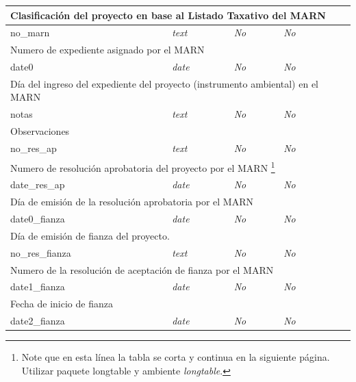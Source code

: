 \begin{longtable}{|l|l|l|l|l|}
	\multicolumn{ 5}{|l|}{Clasificación del proyecto en base al Listado Taxativo del MARN} \\ \hline
		no\_marn & \textit{text} & \textit{No} & \textit{No} & \textit{} \\ \hline

	\multicolumn{ 5}{|l|}{Numero de expediente asignado por el MARN} \\ \hline
		date0 & \textit{date} & \textit{No} & \textit{No} & \textit{} \\ \hline

	\multicolumn{ 5}{|l|}{Día del ingreso del expediente del proyecto (instrumento ambiental) en el MARN} \\ \hline
		notas & \textit{text} & \textit{No} & \textit{No} & \textit{} \\ \hline

	\multicolumn{ 5}{|l|}{Observaciones} \\ \hline
		no\_res\_ap & \textit{text} & \textit{No} & \textit{No} & \textit{} \\ \hline

	\multicolumn{ 5}{|l|}{Numero de resolución aprobatoria del proyecto por el MARN%
	\footnote{Note que en esta línea la tabla se corta y continua en la siguiente página. 
	Utilizar paquete \textsf{longtable} y ambiente \textit{longtable}.}} \\ \hline
		date\_res\_ap & \textit{date} & \textit{No} & \textit{No} & \textit{} \\ \hline

	\multicolumn{ 5}{|l|}{Día de emisión de la resolución aprobatoria por el MARN} \\ \hline
		date0\_fianza & \textit{date} & \textit{No} & \textit{No} & \textit{} \\ \hline

	\multicolumn{ 5}{|l|}{Día de emisión de fianza del proyecto.} \\ \hline
		no\_res\_fianza & \textit{text} & \textit{No} & \textit{No} & \textit{} \\ \hline

	\multicolumn{ 5}{|l|}{Numero de la resolución de aceptación de fianza por el MARN} \\ \hline
		date1\_fianza & \textit{date} & \textit{No} & \textit{No} & \textit{} \\ \hline

	\multicolumn{ 5}{|l|}{Fecha de inicio de fianza} \\ \hline
		date2\_fianza & \textit{date} & \textit{No} & \textit{No} & \textit{} \\ \hline


\end{longtable}
